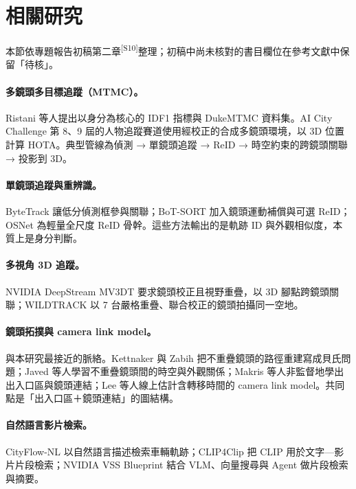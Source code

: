 \documentclass[11pt,a4paper]{article}
\newcommand{\src}[1]{\textsuperscript{\scriptsize[#1]}}
\begin{document}
\section{相關研究}
本節依專題報告初稿第二章\src{S10}整理；初稿中尚未核對的書目欄位在參考文獻中保留「待核」。

\paragraph{多鏡頭多目標追蹤（MTMC）。}Ristani 等人提出以身分為核心的 IDF1 指標與 DukeMTMC 資料集\cite{ristani2016}。AI City Challenge 第 8、9 屆的人物追蹤賽道使用經校正的合成多鏡頭環境，以 3D 位置計算 HOTA\cite{wang2024aic8,tang2025aic9}。典型管線為偵測 → 單鏡頭追蹤 → ReID → 時空約束的跨鏡頭關聯 → 投影到 3D。

\paragraph{單鏡頭追蹤與重辨識。}ByteTrack 讓低分偵測框參與關聯\cite{zhang2022bytetrack}；BoT-SORT 加入鏡頭運動補償與可選 ReID\cite{aharon2022botsort}；OSNet 為輕量全尺度 ReID 骨幹\cite{zhou2019osnet}。這些方法輸出的是軌跡 ID 與外觀相似度，本質上是身分判斷。

\paragraph{多視角 3D 追蹤。}NVIDIA DeepStream MV3DT 要求鏡頭校正且視野重疊，以 3D 腳點跨鏡頭關聯\cite{nvidia_mv3dt}；WILDTRACK 以 7 台嚴格重疊、聯合校正的鏡頭拍攝同一空地\cite{chavdarova2018wildtrack}。

\paragraph{鏡頭拓撲與 camera link model。}與本研究最接近的脈絡。Kettnaker 與 Zabih 把不重疊鏡頭的路徑重建寫成貝氏問題\cite{kettnaker1999}；Javed 等人學習不重疊鏡頭間的時空與外觀關係\cite{javed2003}；Makris 等人非監督地學出出入口區與鏡頭連結\cite{makris2004}；Lee 等人線上估計含轉移時間的 camera link model\cite{lee_cltm}。共同點是「出入口區＋鏡頭連結」的圖結構。

\paragraph{自然語言影片檢索。}CityFlow-NL 以自然語言描述檢索車輛軌跡\cite{feng2021cityflownl}；CLIP4Clip 把 CLIP 用於文字—影片片段檢索\cite{luo2021clip4clip}；NVIDIA VSS Blueprint 結合 VLM、向量搜尋與 Agent 做片段檢索與摘要\cite{nvidia_vss}。
\end{document}
